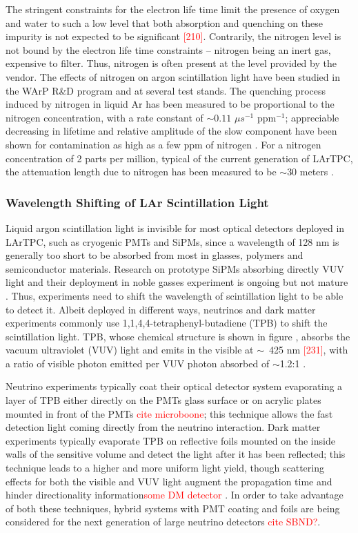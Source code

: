 The stringent constraints for the electron life time limit the presence of oxygen and water to such a low level that both absorption and quenching on these impurity is not expected to be significant \textcolor{red}{[210]}.   Contrarily, the nitrogen level is not bound by the electron life time constraints -- nitrogen being an inert gas, expensive to filter. Thus, nitrogen is often present at the level provided by the vendor. The effects of nitrogen on argon scintillation light have been studied in the WArP R\&D program and at several test stands.
The quenching process induced by nitrogen in liquid Ar has been measured to be proportional to the nitrogen concentration, with a rate constant of $\sim  0.11$ $\mu s^{-1}$ ppm$^{-1}$; appreciable decreasing in lifetime and relative amplitude of the slow component have been shown for contamination as high as a few ppm of nitrogen \cite{1748-0221-5-06-P06003}.
For a nitrogen  concentration of 2 parts per million,  typical of the current generation of LArTPC, the attenuation length due to nitrogen has been measured to be $\sim$30 meters \cite{1748-0221-8-07-P07011}. 



\subsubsection{Wavelength Shifting of LAr Scintillation Light}
Liquid argon scintillation light is invisible for most optical detectors deployed in LArTPC, such as cryogenic PMTs and SiPMs, since a wavelength of 128 nm is  generally too short to be absorbed from most in glasses, polymers and semiconductor materials. Research on prototype SiPMs absorbing directly VUV light and their deployment in noble gasses experiment is ongoing but not mature \cite{1748-0221-8-01-C01003}. Thus, experiments need to shift the wavelength of scintillation light to be able to detect it.  Albeit deployed in different ways, neutrinos and dark matter experiments commonly use  1,1,4,4-tetraphenyl-butadiene (TPB) to shift the scintillation light. 
TPB, whose chemical structure is shown in figure , absorbs the vacuum ultraviolet (VUV) light and emits in the visible at $\sim$~425 nm \textcolor{red}{[231]}, with a ratio of visible photon emitted per VUV photon absorbed of $\sim$1.2:1 \cite{GEHMAN2011116}.

Neutrino experiments typically coat their optical detector system evaporating a layer of TPB either directly on the PMTs glass surface or on acrylic plates mounted in front of the PMTs \textcolor{red}{cite microboone}; this technique allows the fast detection light coming directly from the neutrino interaction. Dark matter experiments typically evaporate TPB on reflective foils mounted on the inside walls of the sensitive volume and detect the light after it has been reflected; this technique leads to a higher and more uniform light yield, though scattering effects for both the visible and VUV light augment the propagation time and hinder directionality information\textcolor{red}{some DM detector} . In order to take advantage of both these techniques, hybrid systems with PMT coating and foils are being considered for the next generation of large neutrino detectors \textcolor{red}{cite SBND?}. 

